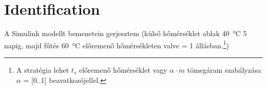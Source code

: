\section{Identification}

A Simulink modellt bemenetein gerjesztem (külső hőmérséklet ablak \SI{40}{\celsius} 5 napig, majd fűtés \SI{60}{\celsius} előremenő hőmérsékleten valve = 1 állásban.\footnote{A stratégia lehet $t_s$ előremenő hőmérséklet vagy $\alpha \cdot \dot m$ tömegáram szabályzása $\alpha$ = [0..1] beavatkozójellel. })

\pagebreak